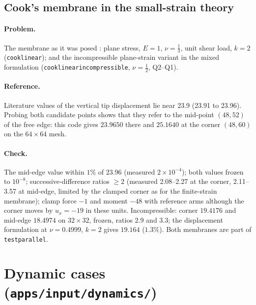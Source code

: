\documentclass[11pt]{article}
\DeclareRobustCommand{\file}[1]{{\def\_{\textunderscore\allowbreak}\texttt{#1}}}
\begin{document}
\subsection{Cook's membrane in the small-strain theory}

\paragraph{Problem.}
The membrane as it was posed \cite{cook}: plane stress, $E = 1$,
$\nu = \tfrac13$, unit shear load, $k = 2$ (\file{cook\_linear}); and the
incompressible plane-strain variant in the mixed formulation
(\file{cook\_linear\_incompressible}, $\nu = \tfrac12$, Q2--Q1).

\paragraph{Reference.}
Literature values of the vertical tip displacement lie near 23.9 (23.91 to
23.96).  Probing both candidate points shows that they refer to the
mid-point $(48, 52)$ of the free edge: this code gives $23.9650$ there and
$25.1640$ at the corner $(48, 60)$ on the $64\times64$ mesh.

\paragraph{Check.}
The mid-edge value within $1\%$ of 23.96 (measured $2\times10^{-4}$); both
values frozen to $10^{-8}$; successive-difference ratios $\ge 2$ (measured
2.08--2.27 at the corner, 2.11--3.57 at mid-edge, limited by the clamped
corner as for the finite-strain membrane); clamp force $-1$ and moment
$-48$ with reference arms although the corner moves by $u_x = -19$ in these
units.  Incompressible: corner $19.4176$ and mid-edge $18.4974$ on
$32\times32$, frozen, ratios 2.9 and 3.3; the displacement formulation at
$\nu = 0.4999$, $k = 2$ gives $19.164$ ($1.3\%$).  Both membranes are part
of \file{test\_parallel}.

\section{Dynamic cases (\texttt{apps/input/dynamics/})}
\label{sec:dynamiccases}
\end{document}
